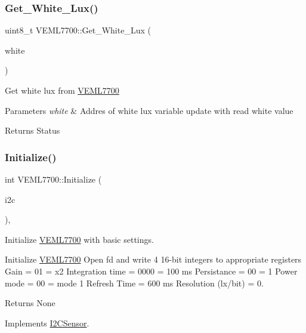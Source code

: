 \subsubsection{\texorpdfstring{Get\+\_\+\+White\+\_\+\+Lux()}{Get\_White\_Lux()}}
{\footnotesize\ttfamily uint8\+\_\+t V\+E\+M\+L7700\+::\+Get\+\_\+\+White\+\_\+\+Lux (\begin{DoxyParamCaption}\item[{float \&}]{white }\end{DoxyParamCaption})}

Get white lux from \hyperlink{classVEML7700}{V\+E\+M\+L7700}


\begin{DoxyParams}{Parameters}
{\em white} & Addres of white lux variable update with read white value\\
\hline
\end{DoxyParams}
\begin{DoxyReturn}{Returns}
Status 
\end{DoxyReturn}
\mbox{\label{classVEML7700_af772ec5fe2bac04428479c9d232f1799}} 
\subsubsection{\texorpdfstring{Initialize()}{Initialize()}}
{\footnotesize\ttfamily int V\+E\+M\+L7700\+::\+Initialize (\begin{DoxyParamCaption}\item[{\hyperlink{classI2CDriver}{I2\+C\+Driver} \&}]{i2c }\end{DoxyParamCaption})\hspace{0.3cm}{\ttfamily [override]}, {\ttfamily [virtual]}}

Initialize \hyperlink{classVEML7700}{V\+E\+M\+L7700} with basic settings.

Initialize \hyperlink{classVEML7700}{V\+E\+M\+L7700} Open fd and write 4 16-\/bit integers to appropriate registers Gain = 01 = x2 Integration time = 0000 = 100 ms Persistance = 00 = 1 Power mode = 00 = mode 1 Refresh Time = 600 ms Resolution (lx/bit) = 0.

\begin{DoxyReturn}{Returns}
None 
\end{DoxyReturn}


Implements \hyperlink{classI2CSensor_a0fb4755ddff3fe2cf5a9651d9d1fe5cd}{I2\+C\+Sensor}.

